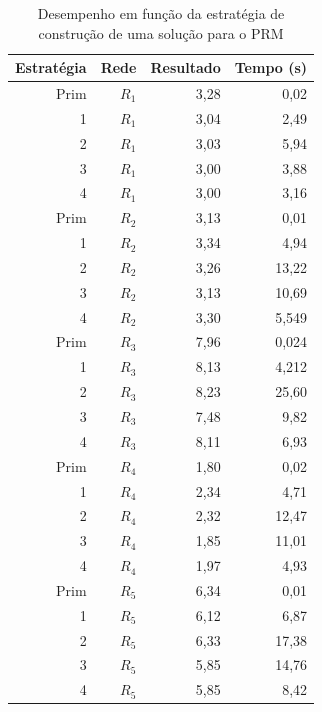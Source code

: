 \begin{table}[!htbp]
	\centering
	\caption{Desempenho em função da estratégia de construção de uma solução para o PRM}
	\label{tab_exp2_estrategias}
	\begin{tabular}{rrrr}
		Estratégia & Rede & Resultado   & Tempo (s)    \\ \hline
		Prim       & $R_1$   & 3,28 & 0,02     \\
		1          & $R_1$   & 3,04 & 2,49     \\
		2          & $R_1$   & 3,03 & 5,94      \\
		\rowcolor{table-green} 
		3          & $R_1$   & 3,00 & 3,88      \\
		\rowcolor{table-green} 
		4          & $R_1$   & 3,00 & 3,16      \\ \hline
		Prim       & $R_2$   & 3,13 & 0,01     \\
		1          & $R_2$   & 3,34 & 4,94     \\
		2          & $R_2$   & 3,26 & 13,22     \\
		\rowcolor{table-green} 
		3          & $R_2$   & 3,13 & 10,69    \\
		4          & $R_2$   & 3,30 & 5,549     \\ \hline
		Prim       & $R_3$   & 7,96 & 0,024     \\
		1          & $R_3$   & 8,13 & 4,212     \\
		2          & $R_3$   & 8,23 & 25,60    \\
		\rowcolor{table-green} 
		3          & $R_3$   & 7,48 & 9,82     \\
		4          & $R_3$   & 8,11 & 6,93     \\ \hline
		Prim       & $R_4$   & 1,80 & 0,02     \\
		1          & $R_4$   & 2,34 & 4,71     \\
		2          & $R_4$   & 2,32 & 12,47    \\
		\rowcolor{table-green} 
		3          & $R_4$   & 1,85 & 11,01    \\
		4          & $R_4$   & 1,97 & 4,93     \\ \hline
		Prim       & $R_5$   & 6,34 & 0,01     \\
		1          & $R_5$   & 6,12 & 6,87      \\
		2          & $R_5$   & 6,33 & 17,38     \\
		\rowcolor{table-green} 
		3          & $R_5$   & 5,85 & 14,76    \\
		\rowcolor{table-green} 
		4          & $R_5$   & 5,85 & 8,42     \\ \hline
	\end{tabular}
\end{table}

